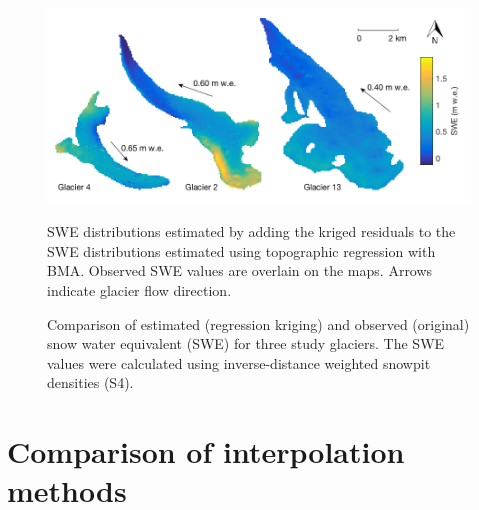 \documentclass[12pt]{article}
\newcommand{\swedots}{Observed SWE values are overlain on the maps. }
\begin{document}
\begin{figure}[H]
	\centering
	\includegraphics[width = \textwidth]{RegressionKriging.png}\\
	\caption{SWE distributions estimated by adding the kriged residuals to the SWE distributions estimated using topographic regression with BMA. \swedots Arrows indicate glacier flow direction.}
	\label{fig:Regression-Kriging}
\end{figure}

\begin{figure}[H]
	\caption{Comparison of estimated (regression kriging) and observed (original) snow water equivalent (SWE) for three study glaciers. The SWE values were calculated using inverse-distance weighted snowpit densities (S4).}
	\label{fig:R2regressionkrig}
\end{figure}


\section{Comparison of interpolation methods}
\end{document}

